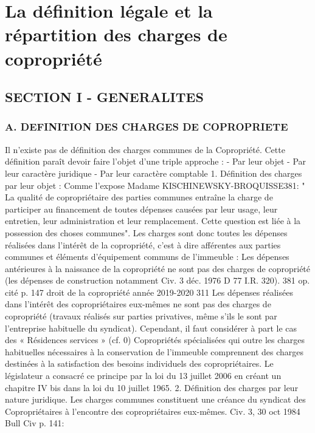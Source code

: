 \chapter{La définition légale et la répartition des charges de copropriété}

\section{SECTION I - GENERALITES}
	
	\subsection{A. DEFINITION DES CHARGES DE COPROPRIETE}
	
		Il n'existe pas de définition des charges communes de la Copropriété.
		Cette définition paraît devoir faire l'objet d'une triple approche :
		- Par leur objet
		- Par leur caractère juridique
		- Par leur caractère comptable
		1. Définition des charges par leur objet :
		Comme l'expose Madame KISCHINEWSKY-BROQUISSE381:
		" La qualité de copropriétaire des parties communes entraîne la charge de participer au financement de toutes dépenses causées par leur usage, leur entretien, leur administration et leur remplacement. Cette question est liée à la possession des choses communes".
		Les charges sont donc toutes les dépenses réalisées dans l'intérêt de la copropriété, c'est à dire afférentes aux parties communes et éléments d'équipement communs de l'immeuble :
		Les dépenses antérieures à la naissance de la copropriété ne sont pas des charges de copropriété (les dépenses de construction notamment Civ. 3 déc. 1976 D 77 I.R. 320).
		381 op. cité p. 147
		droit de la copropriété année 2019-2020
		311
		Les dépenses réalisées dans l'intérêt des copropriétaires eux-mêmes ne sont pas des charges de copropriété (travaux réalisés sur parties privatives, même s'ils le sont par l'entreprise habituelle du syndicat).
		Cependant, il faut considérer à part le cas des « Résidences services » (cf. 0) Copropriétés spécialisées qui outre les charges habituelles nécessaires à la conservation de l'immeuble comprennent des charges destinées à la satisfaction des besoins individuels des copropriétaires. Le législateur a consacré ce principe par la loi du 13 juillet 2006 en créant un chapitre IV bis dans la loi du 10 juillet 1965.
		2. Définition des charges par leur nature juridique.
		Les charges communes constituent une créance du syndicat des Copropriétaires à l'encontre des copropriétaires eux-mêmes.
		Civ. 3\degres, 30 oct 1984 Bull Civ  p. 141:

